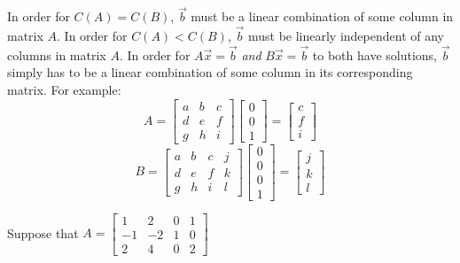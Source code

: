 \documentclass[]{exam}
\begin{document}
\begin{questions}
\begin{solution}
	In order for $C(A) = C(B)$, $\vec{b}$ must be a linear combination of some column in matrix $A$.  In order for $C(A) < C(B)$, $\vec{b}$ must be linearly independent of any columns in matrix $A$.  In order for $A\vec{x}=\vec{b}$ \emph{and} $B\vec{x}=\vec{b}$ to both have solutions, $\vec{b}$ simply has to be a linear combination of some column in its corresponding matrix.  For example:
	\[
		A = \begin{bmatrix}
			a & b & c \\
			d & e & f \\
			g & h & i
		\end{bmatrix}
		\begin{bmatrix}
			0 \\ 0 \\ 1
		\end{bmatrix} =
		\begin{bmatrix}
			c \\ f \\ i
		\end{bmatrix}
	\]
	\[
		B = \begin{bmatrix}
			a & b & c & j \\
			d & e & f & k \\
			g & h & i & l
		\end{bmatrix}
		\begin{bmatrix}
			0 \\ 0 \\ 0 \\ 1
		\end{bmatrix} =
		\begin{bmatrix}
			j \\ k \\ l
		\end{bmatrix}
	\]
\end{solution}

\newpage
\question Suppose that $A = 
\begin{bmatrix}
	1 & 2 & 0 & 1\\
	-1 & -2 & 1 & 0\\
	2 & 4 & 0 & 2
\end{bmatrix}$
\end{questions}
\end{document}
